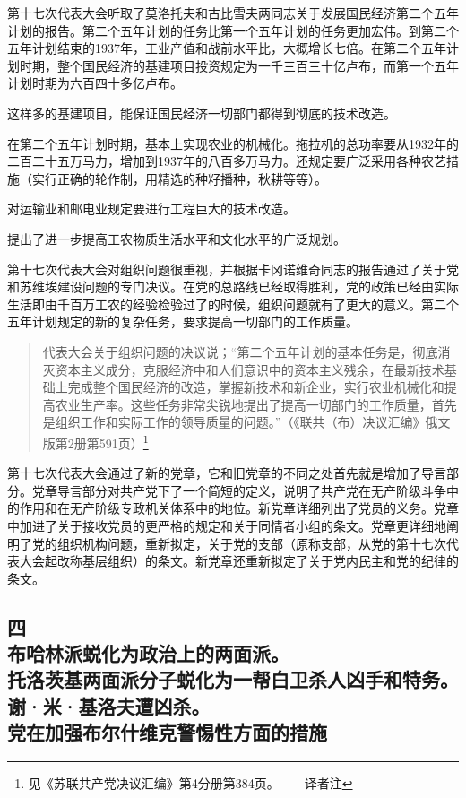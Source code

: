 第十七次代表大会听取了莫洛托夫和古比雪夫两同志关于发展国民经济第二个五年计划的报告。第二个五年计划的任务比第一个五年计划的任务更加宏伟。到第二个五年计划结束的1937年，工业产值和战前水平比，大概增长七倍。在第二个五年计划时期，整个国民经济的基建项目投资规定为一千三百三十亿卢布，而第一个五年计划时期为六百四十多亿卢布。

这样多的基建项目，能保证国民经济一切部门都得到彻底的技术改造。

在第二个五年计划时期，基本上实现农业的机械化。拖拉机的总功率要从1932年的二百二十五万马力，增加到1937年的八百多万马力。还规定要广泛采用各种农艺措施（实行正确的轮作制，用精选的种籽播种，秋耕等等）。

对运输业和邮电业规定要进行工程巨大的技术改造。

提出了进一步提高工农物质生活水平和文化水平的广泛规划。

第十七次代表大会对组织问题很重视，并根据卡冈诺维奇同志的报告通过了关于党和苏维埃建设问题的专门决议。在党的总路线已经取得胜利，党的政策已经由实际生活即由千百万工农的经验检验过了的时候，组织问题就有了更大的意义。第二个五年计划规定的新的复杂任务，要求提高一切部门的工作质量。

\begin{quotation}
代表大会关于组织问题的决议说；“第二个五年计划的基本任务是，彻底消灭资本主义成分，克服经济中和人们意识中的资本主义残余，在最新技术基础上完成整个国民经济的改造，掌握新技术和新企业，实行农业机械化和提高农业生产率。这些任务非常尖锐地提出了提高一切部门的工作质量，首先是组织工作和实际工作的领导质量的问题。”（《联共（布）决议汇编》俄文版第2册第591页）\footnote{见《苏联共产党决议汇编》第4分册第384页。——译者注}
\end{quotation}

第十七次代表大会通过了新的党章，它和旧党章的不同之处首先就是增加了导言部分。党章导言部分对共产党下了一个简短的定义，说明了共产党在无产阶级斗争中的作用和在无产阶级专政机关体系中的地位。新党章详细列出了党员的义务。党章中加进了关于接收党员的更严格的规定和关于同情者小组的条文。党章更详细地阐明了党的组织机构问题，重新拟定，关于党的支部（原称支部，从党的第十七次代表大会起改称基层组织）的条文。新党章还重新拟定了关于党内民主和党的纪律的条文。


\subsection[四\q 布哈林派蜕化为政治上的两面派。托洛茨基两面派分子蜕化为一帮白卫杀人凶手和特务。谢·米·基洛夫遭凶杀。党在加强布尔什维克警惕性方面的措施]{四\\布哈林派蜕化为政治上的两面派。\\托洛茨基两面派分子蜕化为一帮白卫杀人凶手和特务。\\谢·米·基洛夫遭凶杀。\\党在加强布尔什维克警惕性方面的措施}

